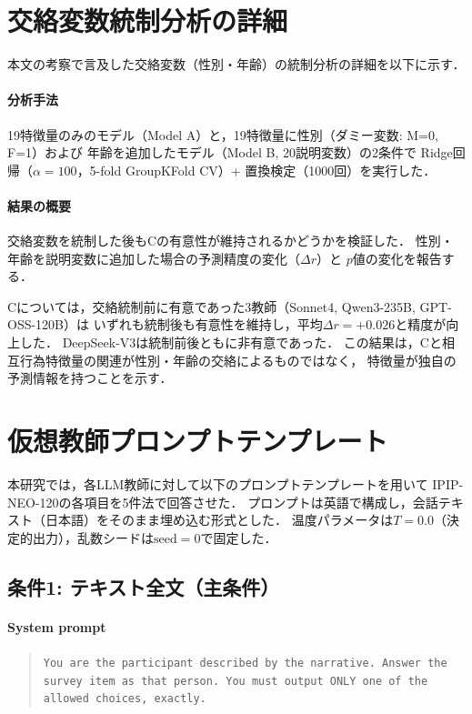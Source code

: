 \documentclass[dvipdfmx,11pt,a4paper]{bxjsarticle}
\begin{document}
\section{交絡変数統制分析の詳細}
\label{sec:appendix_confound}

本文の考察で言及した交絡変数（性別・年齢）の統制分析の詳細を以下に示す．

\paragraph{分析手法}
19特徴量のみのモデル（Model A）と，19特徴量に性別（ダミー変数: M=0, F=1）および
年齢を追加したモデル（Model B, 20説明変数）の2条件で
Ridge回帰（$\alpha = 100$，5-fold GroupKFold CV）+ 置換検定（1000回）を実行した．

\paragraph{結果の概要}
交絡変数を統制した後もCの有意性が維持されるかどうかを検証した．
性別・年齢を説明変数に追加した場合の予測精度の変化（$\Delta r$）と
$p$値の変化を報告する．

Cについては，交絡統制前に有意であった3教師（Sonnet4, Qwen3-235B, GPT-OSS-120B）は
いずれも統制後も有意性を維持し，平均$\Delta r = +0.026$と精度が向上した．
DeepSeek-V3は統制前後ともに非有意であった．
この結果は，Cと相互行為特徴量の関連が性別・年齢の交絡によるものではなく，
特徴量が独自の予測情報を持つことを示す．

\section{仮想教師プロンプトテンプレート}
\label{sec:appendix_prompt}

本研究では，各LLM教師に対して以下のプロンプトテンプレートを用いて
IPIP-NEO-120の各項目を5件法で回答させた．
プロンプトは英語で構成し，会話テキスト（日本語）をそのまま埋め込む形式とした．
温度パラメータは$T = 0.0$（決定的出力），乱数シードは$\text{seed} = 0$で固定した．

\subsection{条件1: テキスト全文（主条件）}
\label{sec:appendix_prompt_cond1}

\paragraph{System prompt}
\begin{quote}
\small
\texttt{You are the participant described by the narrative.
Answer the survey item as that person.
You must output ONLY one of the allowed choices, exactly.}
\end{quote}
\end{document}
